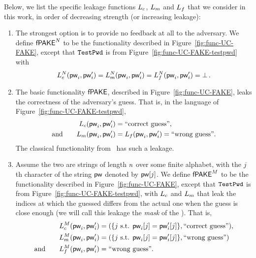 Below, we list the specific leakage functions $L_{c}$, $L_{m}$ and $L_{f}$ that we consider in this work, in order of decreasing strength (or increasing leakage):
\begin{enumerate}
\item
The strongest option is to provide no feedback at all to the adversary.
We define $\textsf{fPAKE}^N$ to be the functionality described in Figure~\ref{fig:func-UC-FAKE}, except that $\texttt{TestPwd}$ is from Figure~\ref{fig:func-UC-FAKE-testpwd} with 
\[
L_{c}^N(\mathsf{pw}_{i}, \mathsf{pw}_{i}') = L_{m}^N(\mathsf{pw}_{i}, \mathsf{pw}_{i}') = L_{f}^N(\mathsf{pw}_{i}, \mathsf{pw}_{i}') = \bot\,.\]

\item 
The basic functionality $\textsf{fPAKE}$, described in Figure~\ref{fig:func-UC-FAKE}, leaks the correctness of the adversary's guess. 
That is, in the language of Figure~\ref{fig:func-UC-FAKE-testpwd},
\begin{align*}
L_{c}(\mathsf{pw}_{i}, \mathsf{pw}_{i}') & = \mbox{``correct guess''}, \\
\mbox{and} \qquad L_{m}(\mathsf{pw}_{i}, \mathsf{pw}_{i}') & = L_{f}(\mathsf{pw}_{i}, \mathsf{pw}_{i}') = \mbox{``wrong guess''}.
\end{align*}
The classical \PAKE functionality from~\cite{EC:CHKLM05} has such a leakage.

\item
Assume the two \passwords are strings of length $n$ over some finite alphabet, with the $j$th character of the string $\mathsf{pw}$ denoted by $\mathsf{pw}[j]$. We define $\textsf{fPAKE}^M$ to be the functionality described in Figure~\ref{fig:func-UC-FAKE}, except that $\texttt{TestPwd}$ is from Figure~\ref{fig:func-UC-FAKE-testpwd}, with $L_{c}$ and $L_{m}$ that leak the indices at which the guessed \password differs from the actual one when the guess is close enough (we will call this leakage the \emph{mask} of the \passwords).
That is,
\begin{align*}
L_{c}^M(\mathsf{pw}_{i}, \mathsf{pw}_{i}') & = (\{j \mbox{ s.t. } \mathsf{pw}_{i}[j] = \mathsf{pw}_{i}'[j]\}, \mbox{``correct guess''}), \\
L_{m}^M(\mathsf{pw}_{i}, \mathsf{pw}_{i}') & = (\{j \mbox{ s.t. } \mathsf{pw}_{i}[j] = \mathsf{pw}_{i}'[j]\}, \mbox{``wrong guess''}) \\
\mbox{and} \qquad L_{f}^M(\mathsf{pw}_{i}, \mathsf{pw}_{i}') & = \mbox{``wrong guess''}.
\end{align*}


\end{enumerate}

